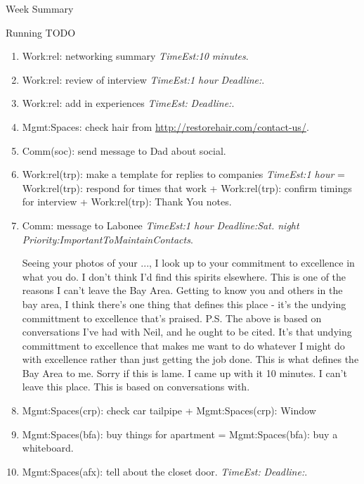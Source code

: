 \documentclass[serif, mathserif, final]{beamer}
\newcommand{\te}[1]{\textit{TimeEst:}\textit{#1}}
\newcommand{\dl}[1]{\textit{Deadline:}\textit{#1}}
\newcommand{\pr}[1]{\textit{Priority:}\textit{#1}}
\begin{document}
\begin{frame}
\begin{columns}
\begin{column}{0.5\linewidth}
\begin{block}{Week Summary}
\begin{block}{Running TODO}
\begin{enumerate}
      \item \tiny Work:rel: networking summary \te{10 minutes}. 

      \item \tiny Work:rel: review of interview \te{1 hour} \dl{}. 
      \item \tiny Work:rel: add in experiences \te{} \dl{}. 

      \item \tiny Mgmt:Spaces: check hair from \url{http://restorehair.com/contact-us/}. 

      \item \tiny Comm(soc): send message to Dad about social. 

      \item \tiny Work:rel(trp): make a template for replies to
        companies \te{1 hour} = Work:rel(trp): respond for times that
        work + Work:rel(trp): confirm timings for interview +
        Work:rel(trp): Thank You notes.
        
      \item \tiny Comm: message to Labonee \te{1 hour} \dl{Sat. night}
        \pr{ImportantToMaintainContacts}.  

        Seeing your photos of your ..., I look up to your commitment to
        excellence in what you do. I don't think I'd find this
        spirits elsewhere. This is one of the reasons I can't leave
        the Bay Area. Getting to know you and others in the bay area, I think
        there's one thing that defines this place - it's the undying
        committment to excellence that's praised. 
        P.S. The above is based on conversations I've had with Neil,
        and he ought to be cited. It's that undying committment to
        excellence that makes me want to do whatever I might do with
        excellence rather than just getting the job done. This is
        what defines the Bay Area to me. Sorry if this is lame. I
        came up with it 10 minutes. I can't leave this place. This
        is based on conversations with. 

        
      \item \tiny Mgmt:Spaces(crp): check car tailpipe +
        Mgmt:Spaces(crp): Window 

      \item \tiny Mgmt:Spaces(bfa): buy things for apartment =
        Mgmt:Spaces(bfa): buy a whiteboard. 

      \item \tiny Mgmt:Spaces(afx): tell about the closet door. \te{}
        \dl{}. 


\end{enumerate}
\end{block}
\end{block}
\end{column}
\end{columns}
\end{frame}
\end{document}
